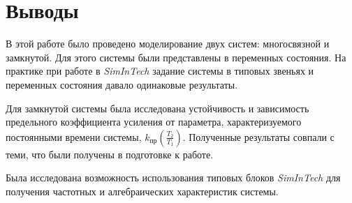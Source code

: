 	\section{Выводы}
	
	В этой работе было проведено моделирование двух систем: многосвязной и замкнутой. Для этого системы были представлены в переменных состояния. На практике при работе в \textit{SimInTech} задание системы в типовых звеньях и переменных состояния давало одинаковые результаты. 
	
	Для замкнутой системы была исследована устойчивость и зависимость предельного коэффициента усиления от параметра, характеризуемого постоянными времени системы, $k_\text{пр}\left(\frac{T_2}{T_1}\right)$. Полученные результаты совпали с теми, что были получены в подготовке к работе.
	
	Была исследована возможность использования типовых блоков \textit{SimInTech} для получения частотных и алгебраических характеристик системы.
	

